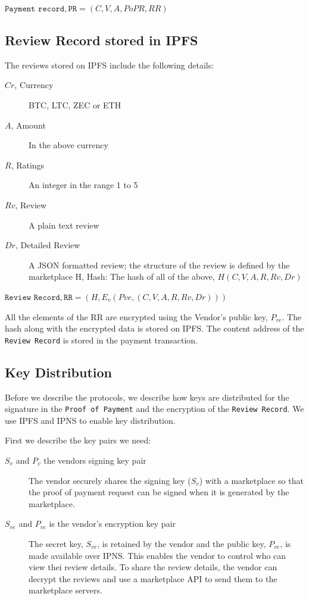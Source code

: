 \documentclass[a4paper]{article}
\begin{document}
$\texttt{Payment record}, \texttt{PR} = (C, V, A, PoPR, RR)$


\subsection{Review Record stored in IPFS}
  
The reviews stored on IPFS include the following details: 

\begin{description}
\item[$Cr$, Currency] BTC, LTC, ZEC or ETH
\item[$A$, Amount] In the above currency
\item[$R$, Ratings] An integer in the range 1 to 5
\item[$Rv$, Review] A plain text review
\item[$Dr$, Detailed Review] A JSON formatted review; the structure of
  the review is defined by the marketplace H, Hash: The hash of all of
  the above, $H(C, V, A, R, Rv, Dr)$
\end{description}

$\texttt{Review Record}, \texttt{RR} = (H, E_v(Pve, (C, V, A, R, Rv, Dr)))$

All the elements of the RR are encrypted using the Vendor's public key,
$P_{ve}$.  The hash along with the encrypted data is stored on IPFS. The
content address of the \texttt{Review Record} is stored in the payment
transaction.

\subsection{Key Distribution}

Before we describe the protocols, we describe how keys are distributed
for the signature in the \texttt{Proof of Payment} and the encryption
of the \texttt{Review Record}. We use IPFS and IPNS to enable key
distribution.

First we describe the key pairs we need:

\begin{description}
\item[$S_v$ and $P_v$ the vendors signing key pair] The vendor securely
  shares the signing key ($S_v$) with a marketplace so that the proof of
  payment request can be signed when it is generated by the
  marketplace.

\item[$S_{ve}$ and $P_{ve}$ is the vendor's encryption key pair] The
  secret key, $S_{ve}$, is retained by the vendor and the public key,
  $P_{ve}$, is made available over IPNS\cite{ipfs}. This enables the
  vendor to control who can view thei review details. To share the
  review details, the vendor can decrypt the reviews and use a
  marketplace API to send them to the marketplace servers.
\end{description}
\end{document}

